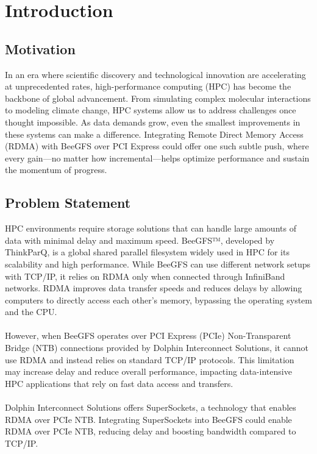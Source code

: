\chapter{Introduction}

\section{Motivation}
In an era where scientific discovery and technological innovation are accelerating at unprecedented rates, high-performance computing (HPC) has become the backbone of global advancement. From simulating complex molecular interactions to modeling climate change, HPC systems allow us to address challenges once thought impossible. As data demands grow, even the smallest improvements in these systems can make a difference. Integrating Remote Direct Memory Access (RDMA) with BeeGFS over PCI Express could offer one such subtle push, where every gain—no matter how incremental—helps optimize performance and sustain the momentum of progress.
\section{Problem Statement}


HPC environments require storage solutions that can handle large amounts of data with minimal delay and maximum speed. BeeGFS™, developed by ThinkParQ, is a global shared parallel filesystem widely used in HPC for its scalability and high performance. While BeeGFS can use different network setups with TCP/IP, it relies on RDMA only when connected through InfiniBand networks. RDMA improves data transfer speeds and reduces delays by allowing computers to directly access each other's memory, bypassing the operating system and the CPU.
\\\\
However, when BeeGFS operates over PCI Express (PCIe) Non-Transparent Bridge (NTB) connections provided by Dolphin Interconnect Solutions, it cannot use RDMA and instead relies on standard TCP/IP protocols. This limitation may increase delay and reduce overall performance, impacting data-intensive HPC applications that rely on fast data access and transfers.
\\\\
Dolphin Interconnect Solutions offers SuperSockets, a technology that enables RDMA over PCIe NTB. Integrating SuperSockets into BeeGFS could enable RDMA over PCIe NTB, reducing delay and boosting bandwidth compared to TCP/IP. 
\\\\

